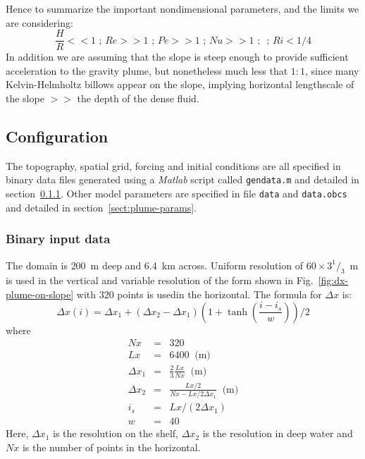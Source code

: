 Hence to summarize the important nondimensional parameters, and 
the limits we are considering:
\begin{equation}
\frac{H}{R} << 1 \mbox{ ; } Re >> 1 \mbox{  ; } Pe >> 1 \mbox{  ; } Nu >> 1
\mbox{  ;  } \mbox{  ; } Ri < 1/4 
\end{equation}
In addition we are assuming that the slope is steep enough to provide 
sufficient acceleration  to the gravity plume, but nonetheless much less 
that $1:1$, since many Kelvin-Helmholtz billows appear on the slope, 
implying horizontal lengthscale of the slope $>>$ the depth of the 
dense fluid. 

\subsection{Configuration}

The topography, spatial grid, forcing and initial conditions are all
specified in binary data files generated using a {\em Matlab} script
called {\tt gendata.m} and detailed in
section~\ref{sect:plume-generating}. Other model parameters are
specified in file {\tt data} and {\tt data.obcs} and detailed in
section~\ref{sect:plume-params}.

\subsubsection{Binary input data}
\label{sect:plume-generating}

The domain is $200$~m deep and $6.4$~km across. Uniform resolution of
$60\times3^1/_3$~m is used in the vertical and variable resolution of
the form shown in Fig.~\ref{fig:dx-plume-on-slope} with $320$ points
is usedin the horizontal. The formula for $\Delta x$ is:
\begin{displaymath}
\Delta x(i) = \Delta x_1 + ( \Delta x_2 - \Delta x_1 )
( 1 + \tanh{\left(\frac{i-i_s}{w}\right)} ) /2
\end{displaymath}
where
\begin{eqnarray*}
Nx & = & 320 \\
Lx & = & 6400 \;\; \mbox{(m)} \\
\Delta x_1 & = & \frac{2}{3} \frac{Lx}{Nx} \;\; \mbox{(m)} \\
\Delta x_2 & = & \frac{Lx/2}{Nx-Lx/2 \Delta x_1} \;\; \mbox{(m)} \\
i_s & = & Lx/( 2 \Delta x_1 ) \\
w & = & 40 
\end{eqnarray*}
Here, $\Delta x_1$ is the resolution on the shelf, $\Delta x_2$ is the
resolution in deep water and $Nx$ is the number of points in the
horizontal.

